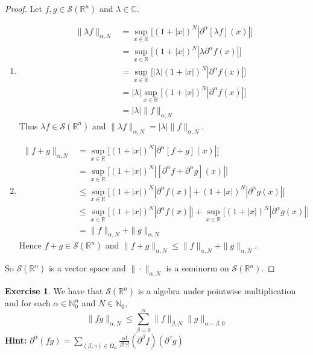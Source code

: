 \documentclass{book}
\theoremstyle{definition}
\newtheorem{ex}[definition]{Exercise}
\newcommand{\al}{\alpha}
\newcommand{\be}{\beta}
\newcommand{\gam}{\gamma}
\newcommand{\lam}{\lambda}
\newcommand{\Om}{\Omega}
\newcommand{\C}{\mathbb{C}}
\newcommand{\N}{\mathbb{N}}
\newcommand{\R}{\mathbb{R}}
\newcommand{\MS}{\mathcal{S}}
\DeclareMathOperator*{\0}{\mbf{0}}
\DeclareMathOperator*{\1}{\mbf{1}}
\newcommand{\p}{\partial}
\begin{document}
	\begin{proof} Let $f, g \in \MS(\R^n)$ and $\lam \in \C$.
		\begin{enumerate}
			\item 
			\begin{align*}
				\|\lam f\|_{\al, N}
				& = \sup_{x \in \R} \bigg[  (1 + |x|)^N |\p^{\al}[\lam f] (x)| \bigg] \\
				& = \sup_{x \in \R} \bigg[  (1 + |x|)^N |\lam \p^{\al}f (x)| \bigg] \\
				& = \sup_{x \in \R} \bigg[  |\lam| (1 + |x|)^N | \p^{\al}f (x)| \bigg] \\
				& = |\lam| \sup_{x \in \R} \bigg[ (1 + |x|)^N | \p^{\al}f (x)| \bigg] \\
				& = |\lam | \|f\|_{\al, N}
			\end{align*}
			Thus $\lam f \in \MS(\R^n)$ and $\|\lam f\|_{\al, N} = |\lam | \|f\|_{\al, N}$.
		\item \begin{align*}
			\|f  +  g\|_{\al, N} 
			& = \sup_{x \in \R} \bigg[  (1 + |x|)^N |\p^{\al}[f + g] (x)| \bigg] \\
			& = \sup_{x \in \R} \bigg[  (1 + |x|)^N |[\p^{\al} f  + \p^{\al} g] (x)| \bigg] \\
			& \leq \sup_{x \in \R} \bigg[  (1 + |x|)^N |\p^{\al} f (x)|  +  (1 + |x|)^N |\p^{\al} g (x)| \bigg] \\
			& \leq \sup_{x \in \R} \bigg[  (1 + |x|)^N |\p^{\al} f (x)| \bigg]   + \sup_{x \in \R} \bigg[ (1 + |x|)^N |\p^{\al} g (x)| \bigg] \\
			& = \|f\|_{\al, N} + \|g\|_{\al, N} 
		\end{align*}
	 	Hence $f + g \in \MS(\R^n)$ and $\|f + g\|_{\al, N} \leq \|f\|_{\al, N} + \|g\|_{\al, N}$.
		\end{enumerate}
		So $\MS(\R^n)$ is a vector space and $\| \cdot \|_{\al, N}$ is a seminorm on $\MS(\R^n)$.
	\end{proof}

	\begin{ex}
		We have that $\MS(\R^n)$ is a algebra under pointwise multiplication and for each $\al \in \N_0^n$ and $N \in  \N_0$, 
		$$\|fg\|_{\al, N} \leq \sum\limits_{\be=0}^\al  \|f\|_{\be, N} \|g\|_{\al - \be, 0}$$
		\textbf{Hint:} $\p^{\al}(fg) = \sum\limits_{(\be, \gam) \in \Om_{\al}} \frac{\al!}{\be! \gam!}(\p^{\be}f) (\p^{\gam}g)$
	\end{ex}
\end{document}
